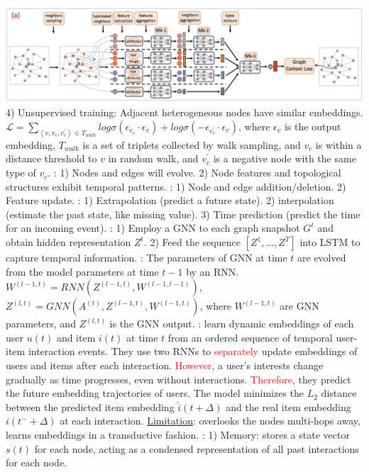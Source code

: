\includegraphics[height=0.052\textwidth]{figs/HetGNN.png}
4) Unsupervised training: Adjacent heterogeneous nodes have similar embeddings. $\mathcal{L}=\sum_{\left \langle v,v_c,v^\prime_c\right \rangle \in T_{walk}} log \sigma(\epsilon_{v_c} \cdot \epsilon_v) + log \sigma (-\epsilon_{v^\prime_c} \cdot \epsilon_v)$, where $\epsilon_v$ is the output embedding, $T_{walk}$ is a set of triplets collected by walk sampling, and $v_c$ is within a distance threshold to $v$ in random walk, and $v^\prime_c$ is a negative node with the same type of $v_c$.
: 1) Nodes and edges will evolve. 2) Node features and topological structures exhibit temporal patterns.
: 1) Node and edge addition/deletion. 2) Feature update.
: 1) Extrapolation (\ie predict a future state). 2) interpolation (\ie estimate the past state, like missing value). 3) Time prediction (\ie predict the time for an incoming event).
: 1) Employ a GNN to each graph snapshot $G^t$ and obtain hidden representation $Z^t$. 2) Feed the sequence $[Z^1, \dots,Z^T]$ into LSTM to capture temporal information.
: The parameters of GNN at time $t$ are evolved from the model parameters at time $t-1$ by an RNN. $W^{(l-1,t)}=RNN(Z^{(l-1,t)},W^{(l-1,t-1)})$,  $Z^{(l,t)}=GNN(A^{(t)},Z^{(l-1,t)},W^{(l-1,t)})$, where $W^{(l-1,t)}$ are GNN parameters, and $Z^{(l,t)}$ is the GNN output.
: learn dynamic embeddings of each user $u(t)$ and item $i(t)$ at time $t$ from an ordered sequence of temporal user-item interaction events. They use two RNNs to \textcolor{red}{separately} update embeddings of users and items after each interaction. \textcolor{red}{However}, a user’s interests change gradually as time progresses, even without interactions. \textcolor{red}{Therefore}, they predict the future embedding trajectories of users. The model minimizes the $L_2$ distance between the predicted item embedding $\hat{i}(t+\Delta)$ and the real item embedding $i(t^-+\Delta)$ at each interaction. \underline{Limitation}: overlooks the nodes multi-hops away, learns embeddings in a transductive fashion.
:
1) Memory: stores a state vector $s(t)$ for each node, acting as a condensed representation of all past interactions for each node.
